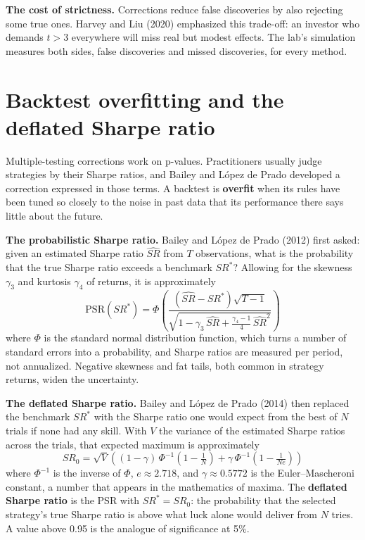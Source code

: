 \textbf{The cost of strictness.} Corrections reduce false discoveries by also rejecting some true ones. Harvey and Liu (2020) emphasized this trade-off: an investor who demands $t > 3$ everywhere will miss real but modest effects. The lab's simulation measures both sides, false discoveries and missed discoveries, for every method.

\section{Backtest overfitting and the deflated Sharpe ratio}
\label{sec:04-deflated}

Multiple-testing corrections work on p-values. Practitioners usually judge strategies by their Sharpe ratios, and Bailey and L\'opez de Prado developed a correction expressed in those terms. A backtest is \textbf{overfit} when its rules have been tuned so closely to the noise in past data that its performance there says little about the future.

\textbf{The probabilistic Sharpe ratio.} Bailey and L\'opez de Prado (2012) first asked: given an estimated Sharpe ratio $\widehat{SR}$ from $T$ observations, what is the probability that the true Sharpe ratio exceeds a benchmark $SR^*$? Allowing for the skewness $\gamma_3$ and kurtosis $\gamma_4$ of returns, it is approximately
\begin{equation}
  \mathrm{PSR}(SR^*) = \Phi\!\left(\frac{(\widehat{SR} - SR^*)\sqrt{T-1}}{\sqrt{1 - \gamma_3\,\widehat{SR} + \frac{\gamma_4 - 1}{4}\,\widehat{SR}^2}}\right)
  \label{eq:04-psr}
\end{equation}
where $\Phi$ is the standard normal distribution function, which turns a number of standard errors into a probability, and Sharpe ratios are measured per period, not annualized. Negative skewness and fat tails, both common in strategy returns, widen the uncertainty.

\textbf{The deflated Sharpe ratio.} Bailey and L\'opez de Prado (2014) then replaced the benchmark $SR^*$ with the Sharpe ratio one would expect from the best of $N$ trials if none had any skill. With $V$ the variance of the estimated Sharpe ratios across the trials, that expected maximum is approximately
\begin{equation}
  SR_0 = \sqrt{V}\left((1-\gamma)\,\Phi^{-1}\!\left(1 - \tfrac{1}{N}\right) + \gamma\,\Phi^{-1}\!\left(1 - \tfrac{1}{N e}\right)\right)
  \label{eq:04-sr0}
\end{equation}
where $\Phi^{-1}$ is the inverse of $\Phi$, $e \approx 2.718$, and $\gamma \approx 0.5772$ is the Euler--Mascheroni constant, a number that appears in the mathematics of maxima. The \textbf{deflated Sharpe ratio} is the PSR with $SR^* = SR_0$: the probability that the selected strategy's true Sharpe ratio is above what luck alone would deliver from $N$ tries. A value above 0.95 is the analogue of significance at 5\%.

